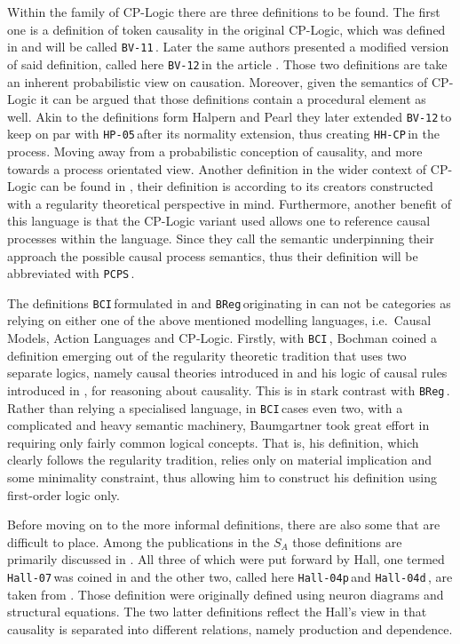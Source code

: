 \documentclass[11pt,a4paper]{book}
\theoremstyle{definition}
\theoremstyle{definition}
\theoremstyle{definition}
\theoremstyle{remark}
\newcommand{\prset}{S_{A}}
\newcommand{\hallp}{\texttt{Hall-04p}\,}
\newcommand{\halld}{\texttt{Hall-04d}\,}
\newcommand{\hpu}{\texttt{HP-05}\,}
\newcommand{\hall}{\texttt{Hall-07}\,}
\newcommand{\bvo}{\texttt{BV-11}\,}
\newcommand{\bvu}{\texttt{BV-12}\,}
\newcommand{\breg}{\texttt{BReg}\,}
\newcommand{\hhcp}{\texttt{HH-CP}\,}
\newcommand{\bci}{\texttt{BCI}\,}
\newcommand{\pcps}{\texttt{PCPS}\,}
\begin{document}
Within the family of CP-Logic there are three definitions to be found. 
The first one is a definition of token causality in the original CP-Logic, which was defined in \parencite{vennekens2011actual} and will be called \bvo. Later the same authors presented a modified version of said definition, called here \bvu in the article \parencite{beckers2012counterfactual}. Those two definitions are take an inherent probabilistic view on causation. Moreover, given the semantics of CP-Logic it can be argued that those definitions contain a procedural element as well.
Akin to the definitions form Halpern and Pearl they later extended \bvu to keep on par with \hpu after its normality extension, thus creating \hhcp in the process.
Moving away from a probabilistic conception of causality, and more towards a process orientated view. 
Another definition in the wider context of CP-Logic can be found in \parencite{denecker2018causal,denecker2019explaining}, their definition is according to its creators constructed with a regularity theoretical perspective in mind. Furthermore, another benefit of this language is that the CP-Logic variant used allows one to reference causal processes within the language. Since they call the semantic underpinning their approach the possible causal process semantics, thus their definition will be abbreviated with \pcps.


The definitions \bci formulated in \parencite{bochman2018actual} and \breg originating in \parencite{baumgartner2013regularity} can not be categories as relying on either one of the above mentioned modelling languages, i.e.\ Causal Models, Action Languages and CP-Logic.
Firstly, with \bci, Bochman coined a definition emerging out of the regularity theoretic tradition that uses two separate logics, namely causal theories introduced in \parencite{mccain1997causal} and his logic of causal rules introduced in \parencite{bochman2004causal}, for reasoning about causality. 
This is in stark contrast with \breg. Rather than relying a specialised language, in \bci cases even two, with a complicated and heavy semantic machinery, Baumgartner took great effort in requiring only fairly common logical concepts. That is, his definition, which clearly follows the regularity tradition, relies only on material implication and some minimality constraint, thus allowing him to construct his definition using first-order logic only.



Before moving on to the more informal definitions, there are also some that are difficult to place.
Among the publications in the $\prset$ those definitions are primarily discussed in \parencite{beckers2016general}. All three of which were put forward by Hall, one termed \hall was coined in \parencite{hall2007structural} and the other two, called here \hallp and \halld, are taken from \parencite{hall2004two}. Those definition were originally defined using neuron diagrams and structural equations. The two latter definitions reflect the Hall's view in \parencite{hall2004two} that causality is separated into different relations, namely production and dependence.
\end{document}
